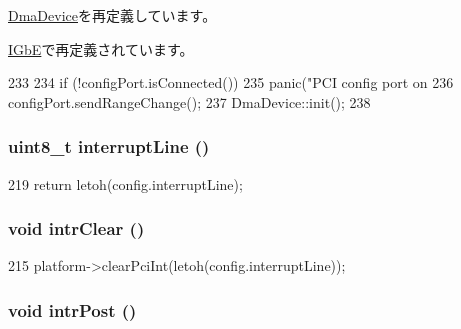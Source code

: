 \hyperlink{classDmaDevice_a02fd73d861ef2e4aabb38c0c9ff82947}{DmaDevice}を再定義しています。

\hyperlink{classIGbE_a02fd73d861ef2e4aabb38c0c9ff82947}{IGbE}で再定義されています。


\begin{DoxyCode}
233 {
234     if (!configPort.isConnected())
235         panic("PCI config port on %
236    configPort.sendRangeChange();
237    DmaDevice::init();
238 }
\end{DoxyCode}
\hypertarget{classPciDevice_a439bff27e8dc8a1b3a8b04aaf8bf7a10}{
\subsubsection[{interruptLine}]{\setlength{\rightskip}{0pt plus 5cm}uint8\_\-t interruptLine ()}}
\label{classPciDevice_a439bff27e8dc8a1b3a8b04aaf8bf7a10}



\begin{DoxyCode}
219     { return letoh(config.interruptLine); }
\end{DoxyCode}
\hypertarget{classPciDevice_ac02b8a3b8685eca8bb4b237b29dfc762}{
\subsubsection[{intrClear}]{\setlength{\rightskip}{0pt plus 5cm}void intrClear ()}}
\label{classPciDevice_ac02b8a3b8685eca8bb4b237b29dfc762}



\begin{DoxyCode}
215     { platform->clearPciInt(letoh(config.interruptLine)); }
\end{DoxyCode}
\hypertarget{classPciDevice_aba6fa755ca152cedafeb4150da6a2493}{
\subsubsection[{intrPost}]{\setlength{\rightskip}{0pt plus 5cm}void intrPost ()}}
\label{classPciDevice_aba6fa755ca152cedafeb4150da6a2493}


